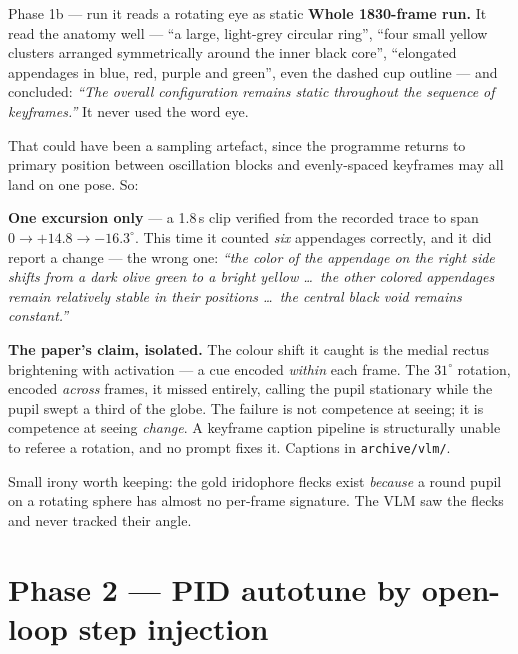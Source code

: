 \documentclass[11pt,a4paper]{article}
\newcommand{\code}[1]{\texttt{#1}}
\begin{document}
\begin{runbox}{Phase 1b --- run \hfill it reads a rotating eye as static}
\textbf{Whole 1830-frame run.} It read the anatomy well --- ``a large, light-grey circular ring'',
``four small yellow clusters arranged symmetrically around the inner black core'', ``elongated
appendages in blue, red, purple and green'', even the dashed cup outline --- and concluded:
\emph{``The overall configuration remains static throughout the sequence of keyframes.''} It never
used the word eye.

That could have been a sampling artefact, since the programme returns to primary position between
oscillation blocks and evenly-spaced keyframes may all land on one pose. So:

\textbf{One excursion only} --- a 1.8\,s clip verified from the recorded trace to span
$0 \to +14.8 \to -16.3^\circ$. This time it counted \emph{six} appendages correctly, and it did
report a change --- the wrong one: \emph{``the color of the appendage on the right side shifts from
a dark olive green to a bright yellow \ldots\ the other colored appendages remain relatively stable
in their positions \ldots\ the central black void remains constant.''}

\begin{tcolorbox}[colback=bad!4,colframe=bad!45,boxrule=0.7pt,arc=2pt]
\textbf{The paper's claim, isolated.} The colour shift it caught is the medial rectus brightening
with activation --- a cue encoded \emph{within} each frame. The $31^\circ$ rotation, encoded
\emph{across} frames, it missed entirely, calling the pupil stationary while the pupil swept a third
of the globe. The failure is not competence at seeing; it is competence at seeing \emph{change}. A
keyframe caption pipeline is structurally unable to referee a rotation, and no prompt fixes it.
Captions in \code{archive/vlm/}.
\end{tcolorbox}

Small irony worth keeping: the gold iridophore flecks exist \emph{because} a round pupil on a
rotating sphere has almost no per-frame signature. The VLM saw the flecks and never tracked their
angle.
\end{runbox}

\section{Phase 2 --- PID autotune by open-loop step injection}
\end{document}
